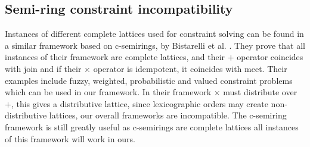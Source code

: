 \subsection{Semi-ring constraint incompatibility}
Instances of different complete lattices used for constraint solving can be found in a similar framework based on c-semirings, 
by Bistarelli et al. \cite{Bistarelli1997}.
They prove that all instances of their framework are complete lattices, and their $+$ operator coincides with join
and if their $\times$ operator is idempotent, it coincides with meet.
Their examples include fuzzy, weighted, probabilistic and valued constraint problems which can be used in our framework.
In their framework $\times$ must distribute over $+$, this gives a distributive lattice,
since lexicographic orders may create non-distributive lattices, our overall frameworks are incompatible.
The c-semiring framework is still greatly useful as c-semirings are complete lattices all instances of this framework will work in ours.






